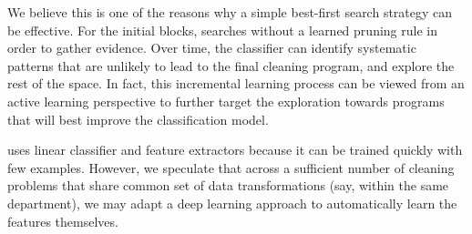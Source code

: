  We believe this is one of the reasons why a simple best-first search strategy can be effective.  For the initial blocks, \sys searches without a learned pruning rule in order to gather evidence.  Over time, the classifier can identify systematic patterns that are unlikely to lead to the final cleaning program, and explore the rest of the space.  In fact, this incremental learning process can be viewed from an active learning perspective to further target the exploration towards programs that will best improve the classification model.  

\sys uses linear classifier and feature extractors because it can be trained quickly with few examples.   However, we speculate that across a sufficient number of cleaning problems that share common set of data transformations (say, within the same department), we may adapt a deep learning approach to automatically learn the features themselves.  








